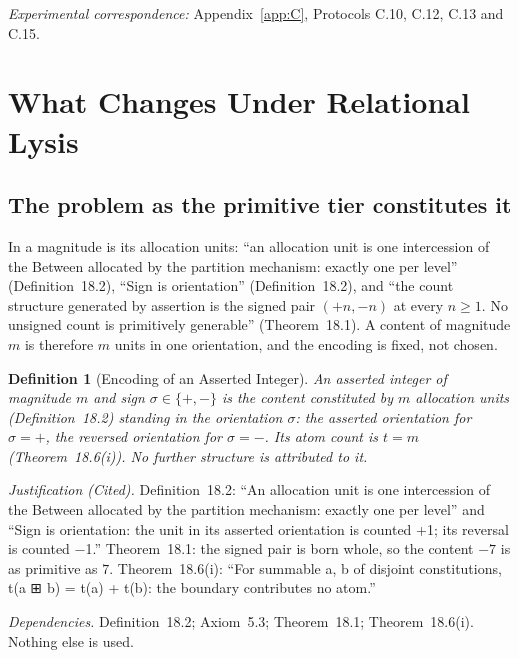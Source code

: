 \documentclass[pdflatex,sn-mathphys-num]{sn-jnl}
\theoremstyle{thmstyleone}%
\theoremstyle{thmstyletwo}%
\theoremstyle{thmstylethree}%
\newtheorem{definition}{Definition}[section]
\newtheorem{definition}{Definition}[section]
\newcommand{\PA}{\cite{Swanagon2026PA}}
\newcommand{\q}[1]{``#1''}        %
\newcommand{\deps}[1]{\par\begin{sloppypar}\noindent\emph{Dependencies.} #1 Nothing else is used.\end{sloppypar}}
\begin{document}
\begin{table}[!htbp]
\centering
\caption{The order of growth of each resolution. The cost law is derived (the three methods from their literature, the structural reading from Protocol~C.15); the two right-hand columns are measured on family~B, means over 25 assertions, as the ratio of mean cost at $n=20$ to $n=12$ and the ratio of mean cost at $n=12$ with every magnitude multiplied by sixteen to the unmultiplied cost.}
\label{tab:growth}
\small

\end{table}

\noindent\emph{Experimental correspondence:} Appendix~\ref{app:C}, Protocols C.10, C.12, C.13 and C.15.

\section{What Changes Under Relational Lysis}\label{sec:change}

\subsection{The problem as the primitive tier constitutes it}
In \PA{} a magnitude is its allocation units: \q{an allocation unit is one intercession of the Between allocated by the partition mechanism: exactly one per level} (Definition~18.2), \q{Sign is orientation} (Definition~18.2), and \q{the count structure generated by assertion is the signed pair $(+n, -n)$ at every $n \ge 1$. No unsigned count is primitively generable} (Theorem~18.1). A content of magnitude $m$ is therefore $m$ units in one orientation, and the encoding is fixed, not chosen.

\begin{definition}[Encoding of an Asserted Integer]\label{def:encoding}
An asserted integer of magnitude $m$ and sign $\sigma\in\{+,-\}$ is the content constituted by $m$ allocation units (Definition~18.2) standing in the orientation $\sigma$: the asserted orientation for $\sigma=+$, the reversed orientation for $\sigma=-$. Its atom count is $t=m$ (Theorem~18.6(i)). No further structure is attributed to it.
\end{definition}
\noindent\emph{Justification (Cited).} Definition~18.2: \q{An allocation unit is one intercession of the Between allocated by the partition mechanism: exactly one per level} and \q{Sign is orientation: the unit in its asserted orientation is counted +1; its reversal is counted −1.} Theorem~18.1: the signed pair is born whole, so the content $-7$ is as primitive as $7$. Theorem~18.6(i): \q{For summable a, b of disjoint constitutions, t(a ⊞ b) = t(a) + t(b): the boundary contributes no atom.}
\deps{Definition~18.2; Axiom~5.3; Theorem~18.1; Theorem~18.6(i).}
\end{document}
